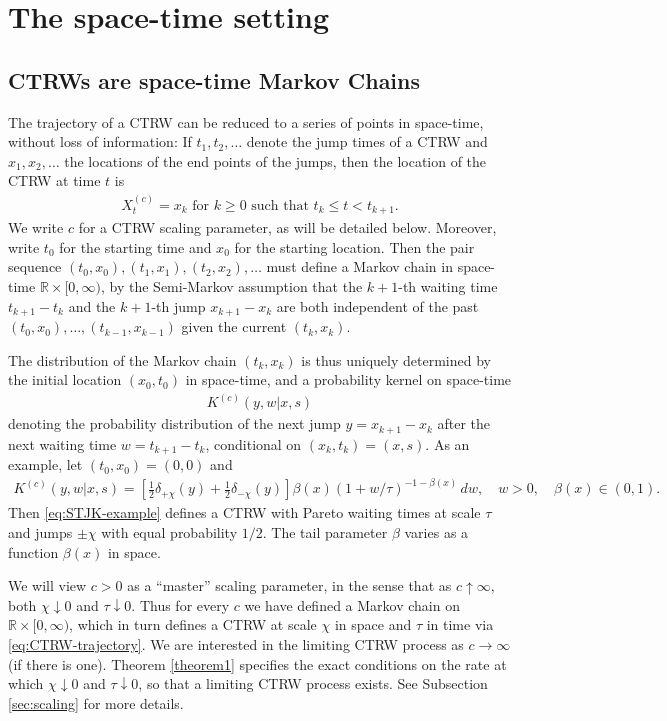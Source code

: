 \documentclass[a4paper,12pt]{elsarticle}
\numberwithin{equation}{section}
\theoremstyle{plain}
\theoremstyle{definition}
\theoremstyle{remark}
\numberwithin{equation}{section}
\newcommand{\spc}{\mathbb R}
\newcommand{\spctim}{\spc \times [0,\infty)}
\newcommand{\1}{\mathbf 1}
\begin{document}
\section{The space-time setting}

\subsection{CTRWs are space-time Markov Chains}

The trajectory of a CTRW can be reduced to a series of points in
space-time, without loss of information: If $t_1, t_2, \ldots$
denote the jump times of a CTRW and $x_1, x_2, \ldots$ the locations
of the end points of the jumps, then the location of the CTRW at time
$t$ is
\begin{align} \label{eq:CTRW-trajectory}
X^{(c)}_t = x_k \text{ for } k \ge 0 \text{ such that }
t_k \le t < t_{k+1}.
\end{align}
We write $c$ for a CTRW scaling parameter, as will be detailed below.
Moreover, write $t_0$ for the starting time and $x_0$ for the starting
location. Then the pair sequence
$(t_0, x_0), (t_1, x_1), (t_2, x_2), \ldots$
must define a Markov chain in space-time $\spctim$,
by the Semi-Markov assumption that the $k+1$-th waiting time $t_{k+1} - t_k$
and the $k+1$-th jump $x_{k+1} - x_k$ are both independent of the past
$(t_0, x_0), \ldots, (t_{k-1}, x_{k-1})$ given the current $(t_k, x_k)$.

The distribution of the Markov chain $(t_k, x_k)$ is thus uniquely
determined by the initial location $(x_0, t_0)$ in space-time,
and a probability kernel on space-time
\begin{align} \label{eq:STJK}
K^{(c)}(y,w | x,s)
\end{align}
denoting the probability distribution of the next jump 
$y = x_{k+1} - x_k$ after the next waiting time
$w = t_{k+1} - t_k$, conditional on $(x_k, t_k) = (x,s)$.
As an example, let $(t_0, x_0) = (0,0)$ and
\begin{align} \label{eq:STJK-example}
K^{(c)}(y,w | x,s) = \left[\frac{1}{2} \delta_{+\chi}(y) + \frac{1}{2} \delta_{-\chi}(y)\right] \beta(x) (1+w/\tau)^{-1-\beta(x)} \, dw,
\quad w > 0, \quad \beta(x) \in (0,1).
\end{align}
Then \eqref{eq:STJK-example} defines a CTRW with Pareto waiting times at scale
$\tau$ and jumps $\pm \chi$ with equal probability $1/2$.  The tail parameter 
$\beta$ varies as a function $\beta(x)$ in space. 


We will view $c > 0$ as a ``master'' scaling parameter, 
in the sense that as $c \uparrow \infty$, both $\chi \downarrow 0$ and 
$\tau \downarrow 0$. 
Thus for every $c$ we have defined a Markov chain on $\spctim$, which
in turn defines a CTRW at scale $\chi$ in space and $\tau$ in time
via \eqref{eq:CTRW-trajectory}.
We are interested in the limiting CTRW process as $c \to \infty$ (if there 
is one).
Theorem \ref{theorem1} specifies the exact conditions on the rate at 
which $\chi \downarrow 0$ and $\tau \downarrow 0$, so that a limiting 
CTRW process exists. 
See Subsection \ref{sec:scaling} for more details. 
\end{document}
